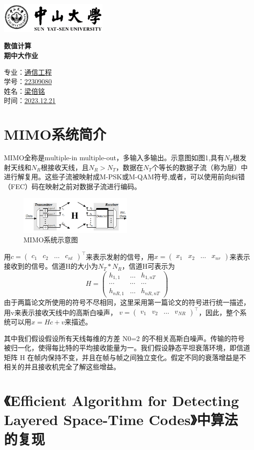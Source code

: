 \documentclass[a4paper,12pt]{article}
\renewcommand{\maketitle}{
	\begin{titlepage}
		\begin{center}
			\includegraphics[width=0.4\textwidth]{1_1.png} %
			\vspace{4cm}
			
			\zihao{1} \textbf{数值计算\\期中大作业} \\
			\vspace{2cm}
			
			\zihao{3} 专业：\uline{通信工程} \\
			\vspace{0.5cm} 
			\zihao{3} 学号：\uline{22309080} \\
			\vspace{0.5cm} 
			\zihao{3} 姓名：\uline{梁倍铭} \\
			\vspace{0.5cm} 
			\zihao{3} 时间：\uline{2023.12.21} \\
			\vfill
		\end{center}
	\end{titlepage}
}
\begin{document}
	\maketitle
	\tableofcontents
	\newpage
	\large
	\onehalfspacing
	\section{MIMO系统简介}
	MIMO全称是multiple-in multiple-out，多输入多输出。示意图如图1,具有$N_T$根发射天线和$N_R$根接收天线，且$N_R>N_T$，数据在$N_T$个等长的数据子流（称为层）中进行解复用。这些子流被映射成M-PSK或M-QAM符号,或者，可以使用前向纠错（FEC）码在映射之前对数据子流进行编码。\par 
	\begin{figure}[h]
		\centering
		\includegraphics[width=0.5\textwidth]{1.png}
		\caption{MIMO系统示意图}
	\end{figure}
	用$c=\begin{pmatrix}
		c_1&c_2&\dots &c_{nt}
	\end{pmatrix}^\top $来表示发射的信号，用$x=\begin{pmatrix}
		x_1&x_2& \dots &x_{nr}
	\end{pmatrix}$来表示接收到的信号。信道H的大小为$N_T*N_R$，信道H可表示为$$H=\begin{pmatrix}
		h_{1,1}& \dots & h_{1,nT} \\
		\cdots &	\cdots	& \cdots \\
		h_{nR,1}& \dots & h_{nR,nT}
	\end{pmatrix}$$
	由于两篇论文所使用的符号不尽相同，这里采用第一篇论文的符号进行统一描述，用v来表示接收天线中的高斯白噪声，
	$v=\begin{pmatrix}
		v_1&v_2& \dots & v_{NR}
	\end{pmatrix}^\top$，因此，整个系统可以用$x=Hc+v$来描述。\par 
	其中我们假设假设所有天线每维的方差 N0=2 的不相关高斯白噪声。传输的符号被归一化，使得每比特的平均接收能量为一。我们假设静态平坦衰落环境，即信道矩阵 H 在帧内保持不变，并且在帧与帧之间独立变化。假定不同的衰落增益是不相关的并且接收机完全了解这些增益。
	\section{《Efficient Algorithm for Detecting Layered Space-Time Codes》中算法的复现}
\end{document}
